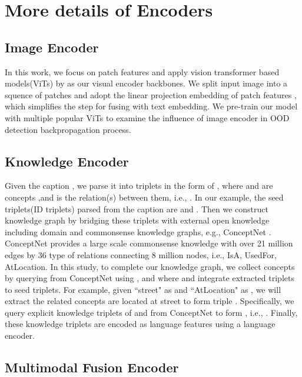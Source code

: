\documentclass{article}
\begin{document}
\newpage
\appendix


\section{More details of Encoders} \label{ap:encoder}

\subsection{Image Encoder} 

In this work, we focus on patch features and apply vision transformer based models(ViTs) by \cite{vaswani2017attention} as our visual encoder backbones. We split input image into a squence of patches and adopt the linear projection embedding of patch features , which simplifies the step for fusing with text   embedding. We pre-train our model with multiple popular ViTs to examine the influence of image encoder in OOD detection backpropagation process. 

\subsection{Knowledge Encoder}

Given the caption , we parse it into triplets in the form of , where  and  are concepts  ,and  is the relation(s) between them, i.e., \textrangle{}. In our example, the seed triplets(ID triplets) parsed from the caption are  and . Then we construct knowledge graph by bridging these triplets with external open knowledge including domain and commonsense knowledge graphs, e.g., ConceptNet \cite{speer2017conceptnet}. ConceptNet provides a large scale commonsense knowledge with over 21 million edges by 36 type of relations connecting 8 million nodes, i.e., {IsA, UsedFor, AtLocation}. In this study, to complete our knowledge graph, we collect concepts by querying from ConceptNet using ,  and  where  and integrate extracted triplets to seed triplets. For example, given ``street" as  and ``AtLocation" as , we will extract the related concepts are located at street to form triple . Specifically, we query explicit knowledge triplets of  and  from ConceptNet to form , i.e., \textrangle{}. Finally, these knowledge triplets  are encoded as language features using a language encoder. 

\subsection{Multimodal Fusion Encoder} 
\end{document}
